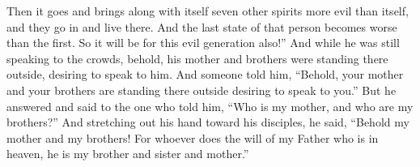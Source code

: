 \begin{biblechapter}
\verse Then it goes and brings along with itself seven other spirits more evil than itself, and they go in and live there. And the last state of that person becomes worse than the first. So it will be for this evil generation also!”
 And while he was still speaking to the crowds, behold, his mother and brothers were standing there outside, desiring to speak to him.
\verse And someone told him, “Behold, your mother and your brothers are standing there outside desiring to speak to you.”
\verse But he answered and said to the one who told him, “Who is my mother, and who are my brothers?”
\verse And stretching out his hand toward his disciples, he said, “Behold my mother and my brothers!
\verse For whoever does the will of my Father who is in heaven, he is my brother and sister and mother.”
\end{biblechapter}

